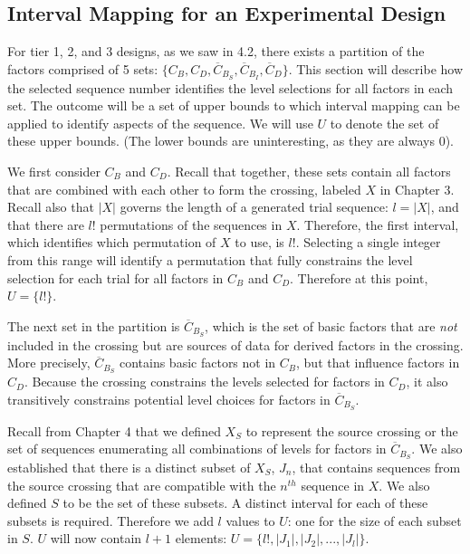 \subsection{Interval Mapping for an Experimental Design}

For tier 1, 2, and 3 designs, as we saw in 4.2, there exists a partition of the factors comprised of 5 sets: $\{C_B, C_D, \overline{C}_{B_S}, \overline{C}_{B_I}, \overline{C}_D\}$. This section will describe how the selected sequence number identifies the level selections for all factors in each set. The outcome will be a set of upper bounds to which interval mapping can be applied to identify aspects of the sequence. We will use $U$ to denote the set of these upper bounds. (The lower bounds are uninteresting, as they are always $0$).

We first consider $C_B$ and $C_D$. Recall that together, these sets contain all factors that are combined with each other to form the crossing, labeled $X$ in Chapter 3. Recall also that $|X|$ governs the length of a generated trial sequence: $l = |X|$, and that there are $l!$ permutations of the sequences in $X$. Therefore, the first interval, which identifies which permutation of $X$ to use, is $l!$. Selecting a single integer from this range will identify a permutation that fully constrains the level selection for each trial for all factors in $C_B$ and $C_D$. Therefore at this point, $U = \{l!\}$.

The next set in the partition is $\overline{C}_{B_S}$, which is the set of basic factors that are \textit{not} included in the crossing but are sources of data for derived factors in the crossing. More precisely, $\overline{C}_{B_S}$ contains basic factors not in $C_B$, but that influence factors in $C_D$. Because the crossing constrains the levels selected for factors in $C_D$, it also transitively constrains potential level choices for factors in $\overline{C}_{B_S}$.

Recall from Chapter 4 that we defined $X_S$ to represent the source crossing or the set of sequences enumerating all combinations of levels for factors in $\overline{C}_{B_S}$. We also established that there is a distinct subset of $X_S$, $J_n$, that contains sequences from the source crossing that are compatible with the $n^{th}$ sequence in $X$. We also defined $S$ to be the set of these subsets. A distinct interval for each of these subsets is required. Therefore we add $l$ values to $U$: one for the size of each subset in $S$. $U$ will now contain $l + 1$ elements: $U = \{l!, |J_1|, |J_2|, ..., |J_l|\}$.

